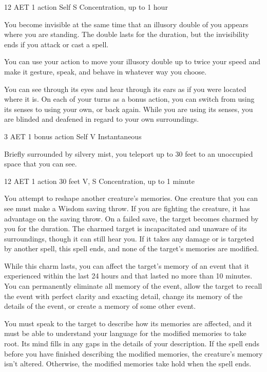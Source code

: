 \label{spell:mislead}
{12 AET}
{1 action}
{Self}
{S}
{Concentration, up to 1 hour}

You become invisible at the same time that an illusory double of you appears where you are standing. The double lasts for the duration, but the invisibility ends if you attack or cast a spell.

You can use your action to move your illusory double up to twice your speed and make it gesture, speak, and behave in whatever way you choose.

You can see through its eyes and hear through its ears as if you were located where it is. On each of your turns as a bonus action, you can switch from using its senses to using your own, or back again. While you are using its senses, you are blinded and deafened in regard to your own surroundings.

\label{spell:misty-step}
{3 AET}
{1 bonus action}
{Self}
{V}
{Instantaneous}

Briefly surrounded by silvery mist, you teleport up to 30 feet to an unoccupied space that you can see.

\label{spell:modify-memory}
{12 AET}
{1 action}
{30 feet}
{V, S}
{Concentration, up to 1 minute}

You attempt to reshape another creature's memories. One creature that you can see must make a Wisdom saving throw. If you are fighting the creature, it has advantage on the saving throw. On a failed save, the target becomes charmed by you for the duration. The charmed target is incapacitated and unaware of its surroundings, though it can still hear you. If it takes any damage or is targeted by another spell, this spell ends, and none of the target's memories are modified.

While this charm lasts, you can affect the target's memory of an event that it experienced within the last 24 hours and that lasted no more than 10 minutes. You can permanently eliminate all memory of the event, allow the target to recall the event with perfect clarity and exacting detail, change its memory of the details of the event, or create a memory of some other event.

You must speak to the target to describe how its memories are affected, and it must be able to understand your language for the modified memories to take root. Its mind fills in any gaps in the details of your description. If the spell ends before you have finished describing the modified memories, the creature's memory isn't altered. Otherwise, the modified memories take hold when the spell ends.

